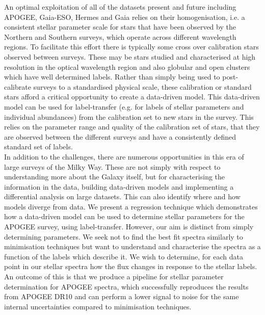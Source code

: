 \documentclass[12pt, preprint]{aastex}
\begin{document}
An optimal exploitation of all of the datasets present and future including APOGEE, Gaia-ESO, Hermes and Gaia relies on their homogenisation, i.e. a consistent stellar parameter scale for stars that have been observed by the Northern and Southern surveys, which operate across different wavelength regions. To facilitate this effort there is typically some cross over calibration stars observed between surveys. These may be stars studied and characterised at high resolution in the optical wavelength region and also globular and open clusters which have well determined labels. Rather than simply being used to post-calibrate surveys to a standardised physical scale, these calibration or standard stars afford a critical opportunity to create a data-driven model.  This data-driven model can be used for label-transfer (e.g. for labels of stellar parameters and individual abundances) from the calibration set to new stars in the survey. This relies on the parameter range and quality of the calibration set of stars, that they are observed between the different surveys and have a consistently defined standard set of labels. \\

In addition to the challenges, there are numerous opportunities in this era of large surveys of the Milky Way. These are not simply with respect to understanding more about the Galaxy itself, but for characterising the information in the data, building data-driven models and implementing a differential analysis on large datasets. This can also identify where and how models diverge from data. We present a regression technique which demonstrates how a data-driven model can be used to determine stellar parameters for the APOGEE survey, using label-transfer. However, our aim is distinct from simply determining parameters. We seek not to find the best fit spectra similarly to minimisation techniques but want to understand and characterise the spectra as a function of the labels which describe it.  We wish to determine, for each data point in our stellar spectra how the flux changes in response to the stellar labels. An outcome of this is that we produce a pipeline for stellar parameter determination for APOGEE spectra, which successfully reproduces the results from APOGEE DR10 and can perform a lower signal to noise for the same internal uncertainties compared to minimisation techniques. \\
\end{document}
